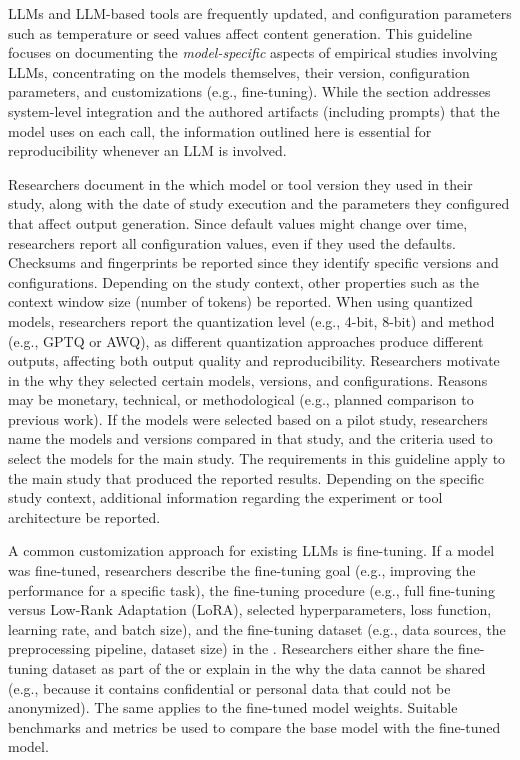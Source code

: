 
LLMs and LLM-based tools are frequently updated, and configuration parameters such as temperature or seed values affect content generation. 
This guideline focuses on documenting the \emph{model-specific} aspects of empirical studies involving LLMs, concentrating on the models themselves, their version, configuration parameters, and customizations (e.g., fine-tuning). While the \design section addresses system-level integration and the authored artifacts (including prompts) that the model uses on each call, the information outlined here is essential for reproducibility whenever an LLM is involved.


Researchers \must document in the \paper which model or tool version they used in their study, along with the date of study execution and the parameters they configured that affect output generation.
Since default values might change over time, researchers \should report all configuration values, even if they used the defaults.
Checksums and fingerprints \should be reported since they identify specific versions and configurations.
Depending on the study context, other properties such as the context window size (number of tokens) \should be reported.
When using quantized models, researchers \should report the quantization level (e.g., 4-bit, 8-bit) and method (e.g., GPTQ or AWQ), as different quantization approaches produce different outputs, affecting both output quality and reproducibility.
Researchers \should motivate in the \paper why they selected certain models, versions, and configurations.
Reasons may be monetary, technical, or methodological (e.g., planned comparison to previous work).
If the models were selected based on a pilot study, researchers \should name the models and versions compared in that study, and the criteria used to select the models for the main study. The requirements in this guideline apply to the main study that produced the reported results.
Depending on the specific study context, additional information regarding the experiment or tool architecture \should be reported.

A common customization approach for existing LLMs is fine-tuning.
If a model was fine-tuned, researchers \must describe the fine-tuning goal (e.g., improving the performance for a specific task), the fine-tuning procedure (e.g., full fine-tuning versus Low-Rank Adaptation (LoRA), selected hyperparameters, loss function, learning rate, and batch size), and the fine-tuning dataset (e.g., data sources, the preprocessing pipeline, dataset size) in the \paper.
Researchers \should either share the fine-tuning dataset as part of the \supplementarymaterial or explain in the \paper why the data cannot be shared (e.g., because it contains confidential or personal data that could not be anonymized).
The same applies to the fine-tuned model weights.
Suitable benchmarks and metrics \should be used to compare the base model with the fine-tuned model.

